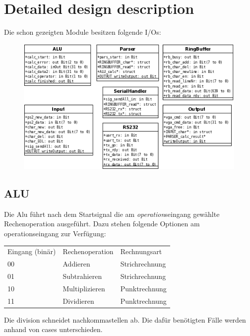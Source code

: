\section{Detailed design description}
Die schon gezeigten Module besitzen folgende I/Os:
\begin{figure}[!ht]
 \includegraphics[scale=0.7]{pics/Klassen.png}
 \label{fig:Klassen}
\end{figure}

\subsection{ALU}
Die Alu führt nach dem Startsignal die am \textit{operation}seingang gewählte 
Rechenoperation ausgeführt. Dazu stehen folgende Optionen am operationseingang zur Verfügung:
\begin{center}
\begin{tabular}[!ht]{|l|l|l|}
\hline Eingang (binär) & Rechenoperation & Rechnungsart\\ 
	00 & Addieren & Strichrechnung\\ 
	01 & Subtrahieren & Strichrechnung\\ 
	10 & Multiplizieren & Punktrechnung\\ 
	11 & Dividieren & Punktrechnung\\
 \hline
\end{tabular}
\end{center}
Die division schneidet nachkommastellen ab.
Die dafür benötigten Fälle werden anhand von cases unterschieden.
